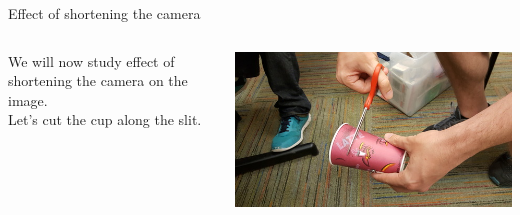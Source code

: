 \begin{frame}{Effect of shortening the camera}
  \begin{columns}
    \begin{column}{0.6\textwidth}
    We will now study effect of shortening the camera on the image.
    \\

    Let's cut the cup along the slit.
    \end{column}
    \begin{column}{0.4\textwidth}
      \includegraphics[width=\textwidth,trim=2.0in 0 2.5in 0,clip]{media/cut-the-cup.jpg}
    \end{column}
  \end{columns}
\end{frame}

